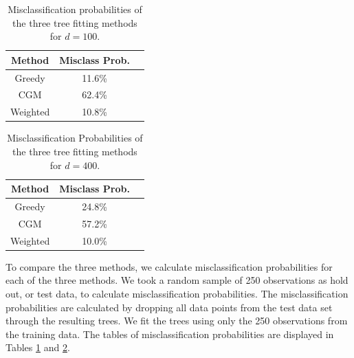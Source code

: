 \begin{table}[h]\footnotesize
\centering
  \begin{tabular}{| c | c | c }
  \hline 
Method & Misclass Prob.\\
      \hline 
Greedy &   11.6\%    \\
 CGM &     62.4\% \\
   Weighted & 10.8\%   \\
      \hline
  \end{tabular}
    \caption[Misclassification probabilities for $d=100$.]{Misclassification probabilities of the three tree fitting methods for $d=100$.}
  \label{tab:sim_misclass1}
\centering
\end{table}

\begin{table}[h]\footnotesize
\centering
  \begin{tabular}{| c | c | c }
  \hline 
Method & Misclass Prob.\\
      \hline 
Greedy &  24.8\%     \\
 CGM &    57.2\% \\
   Weighted &  10.0\%  \\
      \hline
  \end{tabular}
    \caption[Misclassification Probabilities of the three tree fitting methods for $d=400$]{Misclassification Probabilities of the three tree fitting methods for $d=400$.}
  \label{tab:sim_misclass2}
\centering
\end{table}


To compare the three methods, we calculate misclassification probabilities for each of the three methods. We took a random sample of 250 observations as hold out, or test data, to calculate misclassification probabilities. The misclassification probabilities are calculated by dropping all data points from the test data set through the resulting trees. We fit the trees using only the 250 observations from the training data. The tables of misclassification probabilities are displayed in Tables \ref{tab:sim_misclass1} and \ref{tab:sim_misclass2}.


